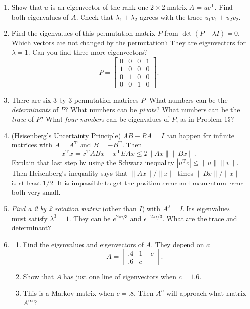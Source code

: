 \documentclass[14pt, a4paper]{article}
\begin{document}
\begin{enumerate}[resume]
    \item Show that $u$ is an eigenvector of the rank one $2 \times 2$ matrix $A = uv^{\mathrm{T}}$. Find both eigenvalues of $A$. Check that $\lambda_1 + \lambda_2$ agrees with the trace $u_1v_1 + u_2v_2$.

    \item Find the eigenvalues of this permutation matrix $P$ from $\det(P - \lambda I) = 0$. Which vectors are not changed by the permutation? They are eigenvectors for $\lambda = 1$. Can you find three more eigenvectors?
          \[
              P = \begin{bmatrix} 0 & 0 & 0 & 1 \\ 1 & 0 & 0 & 0 \\ 0 & 1 & 0 & 0 \\ 0 & 0 & 1 & 0 \end{bmatrix} .
          \]

    \item There are six 3 by 3 permutation matrices $P$. What numbers can be the \textit{determinants} of $P$? What numbers can be \textit{pivots}? What numbers can be the \textit{trace} of $P$? What \textit{four numbers} can be eigenvalues of $P$, as in Problem 15?

    \item (Heisenberg's Uncertainty Principle) $AB - BA = I$ can happen for infinite matrices with $A = A^{\mathrm{T}}$ and $B = -B^{\mathrm{T}}$. Then
          \[
              x^{\mathrm{T}}x = x^{\mathrm{T}}ABx - x^{\mathrm{T}}BAx \le 2\|Ax\| \|Bx\|.
          \]
          Explain that last step by using the Schwarz inequality $|u^{\mathrm{T}}v| \le \|u\|\|v\|$. Then Heisenberg's inequality says that $\|Ax\|/\|x\|$ times $\|Bx\|/\|x\|$ is at least $1/2$. It is impossible to get the position error and momentum error both very small.

    \item \textit{Find a 2 by 2 rotation matrix} (other than $I$) with $A^3 = I$. Its eigenvalues must satisfy $\lambda^3 = 1$. They can be $e^{2\pi i/3}$ and $e^{-2\pi i/3}$. What are the trace and determinant?

    \item
          \begin{enumerate}
              \item Find the eigenvalues and eigenvectors of $A$. They depend on $c$:
                    \[
                        A = \begin{bmatrix} .4 & 1 - c \\ .6 & c \end{bmatrix} .
                    \]
              \item Show that $A$ has just one line of eigenvectors when $c = 1.6$.
              \item This is a Markov matrix when $c = .8$. Then $A^n$ will approach what matrix $A^{\infty}$?
          \end{enumerate}
\end{enumerate}
\end{document}
